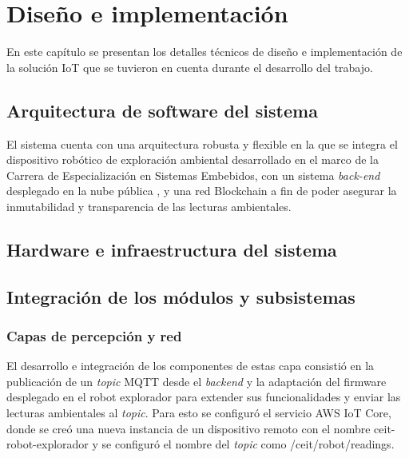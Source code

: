 \chapter{Diseño e implementación} %

\label{Chapter3} %

En este capítulo se presentan los detalles técnicos de diseño e implementación de la solución IoT que se tuvieron en cuenta durante el desarrollo del trabajo.


\section{Arquitectura de software del sistema}


El sistema cuenta con una arquitectura robusta y flexible en la que se integra el dispositivo robótico de exploración ambiental \citep{cese_gonzalo_memoria} desarrollado en el marco de la Carrera de Especialización en Sistemas Embebidos, con un sistema \textit{back-end} desplegado en la nube pública \citep{nube_publica}, y una red Blockchain \cite{blockchain} a fin de poder asegurar la inmutabilidad y transparencia de las lecturas ambientales. 


\section{Hardware e infraestructura del sistema}
 
 
\section{Integración de los módulos y subsistemas}

\subsection{Capas de percepción y red}

El desarrollo e integración de los componentes de estas capa consistió en la publicación de un \textit{topic} MQTT desde el \textit{backend} y la adaptación del firmware desplegado en el robot explorador para extender sus funcionalidades y enviar las lecturas ambientales al \textit{topic}. Para esto se configuró el servicio AWS IoT Core, donde se creó una nueva instancia de un dispositivo remoto con el nombre ceit-robot-explorador y se configuró el nombre del \textit{topic} como /ceit/robot/readings.

